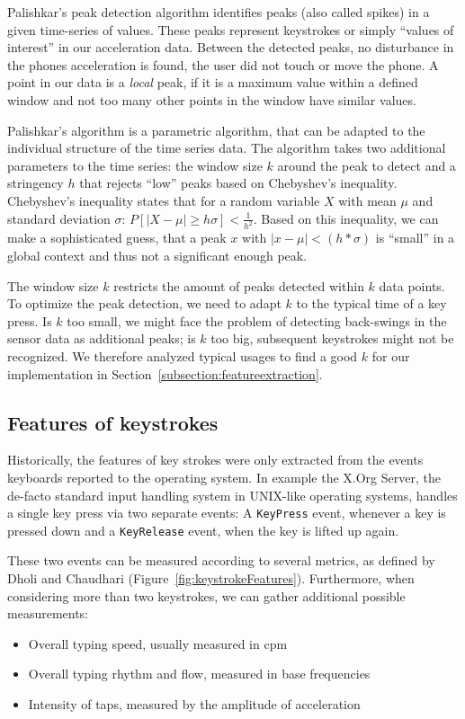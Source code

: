 Palishkar's peak detection algorithm identifies peaks (also called spikes) in a given time-series of values. These peaks represent keystrokes or simply ``values of interest'' in our acceleration data. Between the detected peaks, no disturbance in the phones acceleration is found, \ie the user did not touch or move the phone. A point in our data is a \emph{local} peak, if it is a maximum value within a defined window and not too many other points in the window have similar values.

Palishkar's algorithm is a parametric algorithm, that can be adapted to the individual structure of the time series data. The algorithm takes two additional parameters to the time series: the window size $k$ around the peak to detect and a stringency $h$ that rejects ``low'' peaks based on Chebyshev's inequality. Chebyshev's inequality states that for a random variable $X$ with mean $\mu$ and standard deviation $\sigma$: $P[|X - \mu| \geq h\sigma] < \frac{1}{h^2}$. Based on this inequality, we can make a sophisticated guess, that a peak $x$ with $|x - \mu| < (h * \sigma)$ is ``small'' in a global context and thus not a significant enough peak.

The window size $k$ restricts the amount of peaks detected within $k$ data points. To optimize the peak detection, we need to adapt $k$ to the typical time of a key press. Is $k$ too small, we might face the problem of detecting back-swings in the sensor data as additional peaks; is $k$ too big, subsequent keystrokes might not be recognized. We therefore analyzed typical usages to find a good $k$ for our implementation in Section~\ref{subsection:featureextraction}.

\subsection{Features of keystrokes}
Historically, the features of key strokes were only extracted from the events keyboards reported to the operating system. In example the X.Org Server, the de-facto standard input handling system in UNIX-like operating systems, handles a single key press via two separate events: A \lstinline$KeyPress$ event, whenever a key is pressed down and a \lstinline$KeyRelease$ event, when the key is lifted up again.

These two events can be measured according to several metrics, as defined by Dholi and Chaudhari \cite{dholi2013typing} (\cf Figure~\ref{fig:keystrokeFeatures}). Furthermore, when considering more than two keystrokes, we can gather additional possible measurements: 
\begin{itemize}
    \item Overall typing speed, usually measured in \gls{cpm}
    \item Overall typing rhythm and flow, measured in base frequencies
    \item Intensity of taps, measured by the amplitude of acceleration
\end{itemize}

